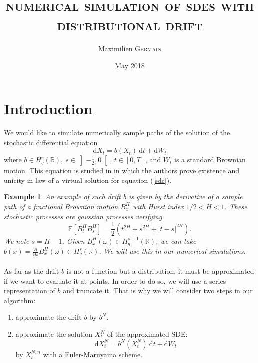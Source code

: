 \documentclass{article}[12pt]
\newcommand{\pade}[2]{\frac{\partial #1}{\partial #2}}
\newtheorem{ex}{Example}[section]
\newcommand{\R}{\mathbb{R}}
\newcommand{\E}{\mathbb{E}}
\newcommand{\di}{\mathrm{d}}
\begin{document}
\title{\Large \textsc{\textbf{numerical simulation of sdes with distributional drift}}} \author{Maximilien \textsc{Germain} \date{May 2018}}
\maketitle

\section{Introduction}

    \paragraph{}
    We would like to simulate numerically sample paths of the solution of the stochastic differential equation
    \begin{equation} \label{sde}
    \di X_t = b(X_t)\ \di t + \di W_t
    \end{equation}
    where $b\in H^s_q(\R),\ s\in\left]-\frac{1}{2},0\right[$, $t\in[0,T]$, and $W_t$ is a standard Brownian motion. This equation is studied in \cite{Fla-Iss-Rus-2017} in which the authors prove existence and unicity in law of a virtual solution for equation (\ref{sde}). 
    
    \begin{ex}
        An example of such drift $b$ is given by the derivative of a sample path of a fractional Brownian motion $B^H_x$ with Hurst index $1/2<H<1$. These stochastic processes are gaussian processes verifying $$\E\left[B_t^HB_s^H\right]=\frac{1}{2}\left(t^{2H}+s^{2H}+|t-s|^{2H}\right).$$ We note $s = H - 1$. Given $B^H_x(\omega)\in H^{s+1}_q(\R)$, we can take $b(x) = \pade{}{x}B^H_x(\omega)\in H^s_q(\R)$. We will use this in our numerical simulations.
    \end{ex}    
    
    \paragraph{}
    As far as the drift $b$ is not a function but a distribution, it must be approximated if we want to evaluate it at points. In order to do so, we will use a series representation of $b$ and truncate it. That is why we will consider two steps in our algorithm: \begin{enumerate}
        \item approximate the drift $b$ by $b^N$.
        \item approximate the solution $X^N_t$ of the approximated SDE:
        \begin{equation} \label{sde2}
        \di X^N_t = b^N\left(X^N_t\right)\ \di t + \di W_t
        \end{equation} 
        by $X^{N,n}_t$ with a Euler-Maruyama scheme.
    \end{enumerate}
\end{document}
